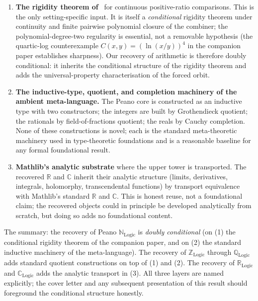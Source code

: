 \documentclass[11pt,a4paper]{article}
\theoremstyle{definition}
\theoremstyle{remark}
\begin{document}
\begin{enumerate}[leftmargin=1.6em, label=(\arabic*)]
\item \textbf{The rigidity theorem of}~\cite{Washburn2026LogicFE}
for continuous positive-ratio comparisons. This is the only
setting-specific input. It is itself a \emph{conditional} rigidity
theorem under continuity and finite pairwise polynomial closure of
the combiner; the polynomial-degree-two regularity is essential, not
a removable hypothesis (the quartic-log counterexample
$C(x, y) = (\ln(x/y))^4$ in the companion paper establishes
sharpness). Our recovery of arithmetic is therefore doubly
conditional: it inherits the conditional structure of the rigidity
theorem and adds the universal-property characterisation of the
forced orbit.

\item \textbf{The inductive-type, quotient, and completion
machinery of the ambient meta-language.} The Peano core is
constructed as an inductive type with two constructors; the integers
are built by Grothendieck quotient; the rationals by
field-of-fractions quotient; the reals by Cauchy completion. None
of these constructions is novel; each is the standard meta-theoretic
machinery used in type-theoretic foundations and is a reasonable
baseline for any formal foundational result.

\item \textbf{Mathlib's analytic substrate} where the upper tower
is transported. The recovered $\mathbb{R}$ and $\mathbb{C}$ inherit
their analytic structure (limits, derivatives, integrals, holomorphy,
transcendental functions) by transport equivalence with Mathlib's
standard $\mathbb{R}$ and $\mathbb{C}$. This is honest reuse, not a
foundational claim; the recovered objects could in principle be
developed analytically from scratch, but doing so adds no
foundational content.
\end{enumerate}

The summary: the recovery of Peano $\mathbb{N}_{\mathrm{Logic}}$ is
\emph{doubly conditional} (on (1) the conditional rigidity theorem
of the companion paper, and on (2) the standard inductive machinery
of the meta-language). The recovery of $\mathbb{Z}_{\mathrm{Logic}}$
through $\mathbb{Q}_{\mathrm{Logic}}$ adds standard quotient
constructions on top of (1) and (2). The recovery of
$\mathbb{R}_{\mathrm{Logic}}$ and $\mathbb{C}_{\mathrm{Logic}}$ adds
the analytic transport in (3). All three layers are named
explicitly; the cover letter and any subsequent presentation of this
result should foreground the conditional structure honestly.
\end{document}
